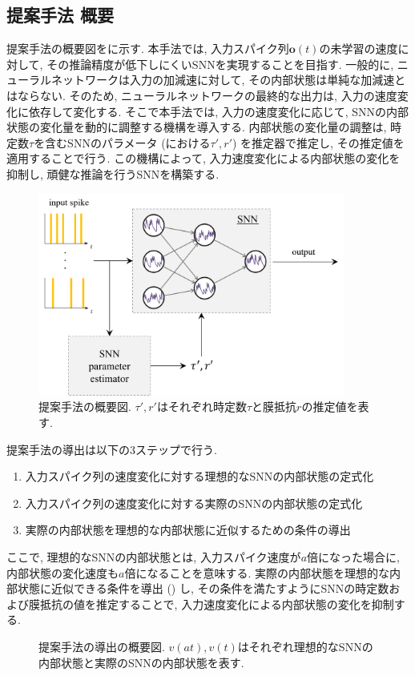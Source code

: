 \subsection{提案手法 概要}
提案手法の概要図をに示す.
本手法では, 入力スパイク列$\bm{o}(t)$の未学習の速度に対して, その推論精度が低下しにくいSNNを実現することを目指す.
一般的に, ニューラルネットワークは入力の加減速に対して, その内部状態は単純な加減速とはならない.
そのため, ニューラルネットワークの最終的な出力は, 入力の速度変化に依存して変化する.
そこで本手法では, 入力の速度変化に応じて, SNNの内部状態の変化量を動的に調整する機構を導入する.
内部状態の変化量の調整は, 時定数$\tau$を含むSNNのパラメータ (における$\tau', r'$) を推定器で推定し, その推定値を適用することで行う.
この機構によって, 入力速度変化による内部状態の変化を抑制し, 頑健な推論を行うSNNを構築する.

\begin{figure}[htb]
    \centering
    \includegraphics[width=0.9\textwidth]{Static/chap2_sec2_methodstr.png}
    \caption[提案手法の概要図]{
        提案手法の概要図.
        $\tau', r'$はそれぞれ時定数$\tau$と膜抵抗$r$の推定値を表す.
    }
    \label{fig:proposed_method}
\end{figure}

提案手法の導出は以下の3ステップで行う.
\begin{enumerate}
    \item 入力スパイク列の速度変化に対する理想的なSNNの内部状態の定式化
    \item 入力スパイク列の速度変化に対する実際のSNNの内部状態の定式化
    \item 実際の内部状態を理想的な内部状態に近似するための条件の導出
\end{enumerate}
ここで, 理想的なSNNの内部状態とは, 入力スパイク速度が$a$倍になった場合に, 内部状態の変化速度も$a$倍になることを意味する.
実際の内部状態を理想的な内部状態に近似できる条件を導出 () し, その条件を満たすようにSNNの時定数および膜抵抗の値を推定することで, 入力速度変化による内部状態の変化を抑制する.
\begin{figure}[htb]
    \centering
    
    \caption[提案手法の導出の概要図]{
        提案手法の導出の概要図.
        $v(at), v(t)$はそれぞれ理想的なSNNの内部状態と実際のSNNの内部状態を表す.
    }
    \label{fig:proposed_method_intro}
\end{figure}


